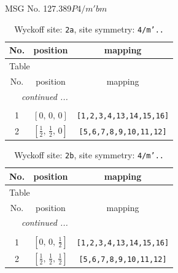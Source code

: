 \documentclass[fleqn,8pt]{jsarticle}
\begin{document}
\setcounter{MaxMatrixCols}{32}

\renewcommand{\tablename}{Table~}
\renewcommand{\figurename}{Figure~}
\begin{center}
\LARGE
MSG No. 127.389\quad$P4/m'bm$
\end{center}
\renewcommand{\arraystretch}{1.2}
\begin{longtable}{ccc}
\caption{Wyckoff site: {\tt 2a}, site symmetry: {\tt 4/m'..}}
 \\
 \hline \hline
No. & position & mapping \\ \hline \endfirsthead

\multicolumn{2}{l}{\tablename\ \thetable{}} \\
 \hline \hline
No. & position & mapping \\ \hline \endhead

 \hline \hline
\multicolumn{2}{r}{\footnotesize\it continued ...} \\ \endfoot

 \hline \hline
\multicolumn{2}{r}{} \\ \endlastfoot

1 & $\left[ 0,\, 0,\, 0 \right]$ & {\tt [1,2,3,4,13,14,15,16]} \\ \hline
2 & $\left[ \frac{1}{2},\, \frac{1}{2},\, 0 \right]$ & {\tt [5,6,7,8,9,10,11,12]} \\
\end{longtable}
\renewcommand{\arraystretch}{1.2}
\begin{longtable}{ccc}
\caption{Wyckoff site: {\tt 2b}, site symmetry: {\tt 4/m'..}}
 \\
 \hline \hline
No. & position & mapping \\ \hline \endfirsthead

\multicolumn{2}{l}{\tablename\ \thetable{}} \\
 \hline \hline
No. & position & mapping \\ \hline \endhead

 \hline \hline
\multicolumn{2}{r}{\footnotesize\it continued ...} \\ \endfoot

 \hline \hline
\multicolumn{2}{r}{} \\ \endlastfoot

1 & $\left[ 0,\, 0,\, \frac{1}{2} \right]$ & {\tt [1,2,3,4,13,14,15,16]} \\ \hline
2 & $\left[ \frac{1}{2},\, \frac{1}{2},\, \frac{1}{2} \right]$ & {\tt [5,6,7,8,9,10,11,12]} \\
\end{longtable}
\end{document}
